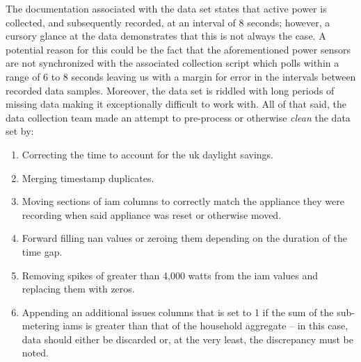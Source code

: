 \noindent \newline The documentation associated with the data set states that active power is collected, and subsequently recorded, at an interval of 8 seconds; however, a cursory glance at the data demonstrates that this is not always the case. A potential reason for this could be the fact that the aforementioned power sensors are not synchronized with the associated collection script which polls within a range of 6 to 8 seconds leaving us with a margin for error in the intervals between recorded data samples. Moreover, the data set is riddled with long periods of missing data making it exceptionally difficult to work with. All of that said, the data collection team made an attempt to pre-process or otherwise \textit{clean} the data set by:

\begin{enumerate}
    \item Correcting the time to account for the \gls{uk} daylight savings.
    \item Merging timestamp duplicates.
    \item Moving sections of \gls{iam} columns to correctly match the appliance they were recording when said appliance was reset or otherwise moved.
    \item Forward filling \gls{nan} values or zeroing them depending on the duration of the time gap.
    \item Removing spikes of greater than 4,000 watts from the \gls{iam} values and replacing them with zeros.
    \item Appending an additional issues columns that is set to 1 if the sum of the sub-metering \glspl{iam} is greater than that of the household aggregate -- in this case, data should either be discarded or, at the very least, the discrepancy must be noted.
\end{enumerate}

